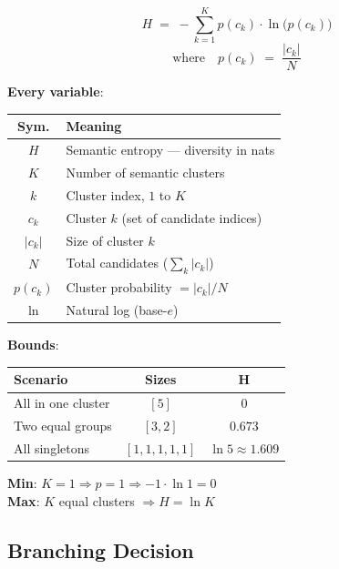 \documentclass[10pt,a4paper,twocolumn]{article}
\begin{document}
\begin{mathbox}[title=Semantic Entropy (Discrete Variant)]
\[
H \;=\; -\sum_{k=1}^{K} p(c_k) \cdot \ln\bigl(p(c_k)\bigr)
\]
\vspace{-6pt}
\[
\text{where} \quad p(c_k) \;=\; \frac{|c_k|}{N}
\]
\end{mathbox}

\textbf{Every variable}:

\begin{scriptsize}
\begin{tabular}{@{}cp{}@{}}
\toprule
\textbf{Sym.} & \textbf{Meaning} \\
\midrule
$H$ & Semantic entropy --- diversity in nats \\
$K$ & Number of semantic clusters \\
$k$ & Cluster index, $1$ to $K$ \\
$c_k$ & Cluster $k$ (set of candidate indices) \\
$|c_k|$ & Size of cluster $k$ \\
$N$ & Total candidates ($\sum_k |c_k|$) \\
$p(c_k)$ & Cluster probability $= |c_k|/N$ \\
$\ln$ & Natural log (base-$e$) \\
\bottomrule
\end{tabular}
\end{scriptsize}

\textbf{Bounds}:

\begin{small}
\begin{tabular}{@{}lcc@{}}
\toprule
\textbf{Scenario} & \textbf{Sizes} & $\bm{H}$ \\
\midrule
All in one cluster & $[5]$ & $0$ \\
Two equal groups & $[3,2]$ & $0.673$ \\
All singletons & $[1,1,1,1,1]$ & $\ln 5 \approx 1.609$ \\
\bottomrule
\end{tabular}
\end{small}

\textbf{Min}: $K{=}1 \Rightarrow p{=}1 \Rightarrow -1\cdot\ln 1 = 0$\\
\textbf{Max}: $K$ equal clusters $\Rightarrow H = \ln K$

\subsection{Branching Decision}
\end{document}
